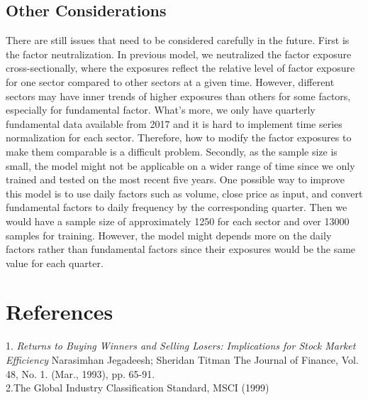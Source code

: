 \documentclass{article}
\begin{document}
\subsection{Other Considerations}
There are still issues that need to be considered carefully in the future. First is the factor neutralization. In previous model, we neutralized the factor exposure cross-sectionally, where the exposures reflect the relative level of factor exposure for one sector compared to other sectors at a given time. However, different sectors may have inner trends of higher exposures than others for some factors, especially for fundamental factor. What's more, we only have quarterly fundamental data available from 2017 and it is hard to implement time series normalization for each sector. Therefore, how to modify the factor exposures to make them comparable is a difficult problem. Secondly, as the sample size is small, the model might not be applicable on a wider range of time since we only trained and tested on the most recent five years. One possible way to improve this model is to use daily factors such as volume, close price as input, and convert fundamental factors to daily frequency by the corresponding quarter. Then we would have a sample size of approximately 1250 for each sector and over 13000 samples for training. However, the model might depends more on the daily factors rather than fundamental factors since their exposures would be the same value for each quarter.
\section{References}
1. \textit{Returns to Buying Winners and Selling Losers: Implications for Stock Market Efficiency} Narasimhan Jegadeesh; Sheridan Titman
The Journal of Finance, Vol. 48, No. 1. (Mar., 1993), pp. 65-91.\\
2.The Global Industry Classification Standard, MSCI (1999)
\end{document}
